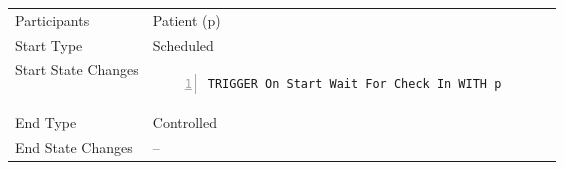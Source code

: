 \begin{tabular}{@{}>{\raggedright\arraybackslash}p{4.5cm}>{\raggedright\arraybackslash}p{12.5cm}@{}}
  \toprule
  Participants  & Patient (p) \\
  Start Type & Scheduled \\
  Start State Changes &
  \begin{Verbatim}[numbers=left]
TRIGGER On Start Wait For Check In WITH p
  \end{Verbatim}
  \\
 End Type& Controlled \\
 End State Changes & --\\ \bottomrule
  \end{tabular}